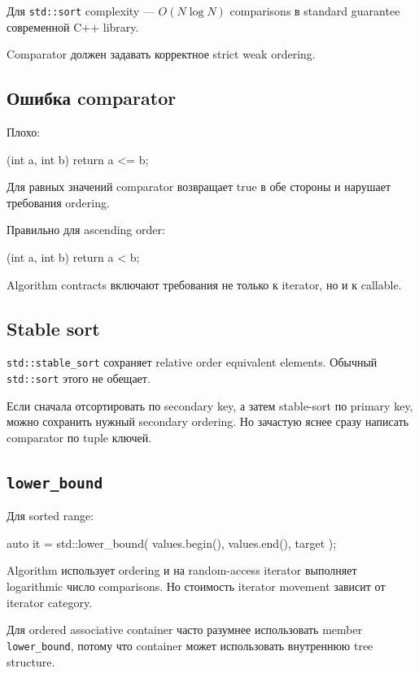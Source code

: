 Для \texttt{std::sort} complexity --- $O(N \log N)$ comparisons в standard
guarantee современной C++ library.

Comparator должен задавать корректное strict weak ordering.

\subsection{Ошибка comparator}

Плохо:

\begin{cppcode}
[](int a, int b) {
    return a <= b;
}
\end{cppcode}

Для равных значений comparator возвращает true в обе стороны и нарушает
требования ordering.

Правильно для ascending order:

\begin{cppcode}
[](int a, int b) {
    return a < b;
}
\end{cppcode}

Algorithm contracts включают требования не только к iterator, но и к callable.

\subsection{Stable sort}

\texttt{std::stable\_sort} сохраняет relative order equivalent elements.
Обычный \texttt{std::sort} этого не обещает.

Если сначала отсортировать по secondary key, а затем stable-sort по primary key,
можно сохранить нужный secondary ordering. Но зачастую яснее сразу написать
comparator по tuple ключей.

\subsection{\texttt{lower\_bound}}

Для sorted range:

\begin{cppcode}
auto it = std::lower_bound(
    values.begin(),
    values.end(),
    target
);
\end{cppcode}

Algorithm использует ordering и на random-access iterator выполняет logarithmic
число comparisons. Но стоимость iterator movement зависит от iterator category.

Для ordered associative container часто разумнее использовать member
\texttt{lower\_bound}, потому что container может использовать внутреннюю
tree structure.

